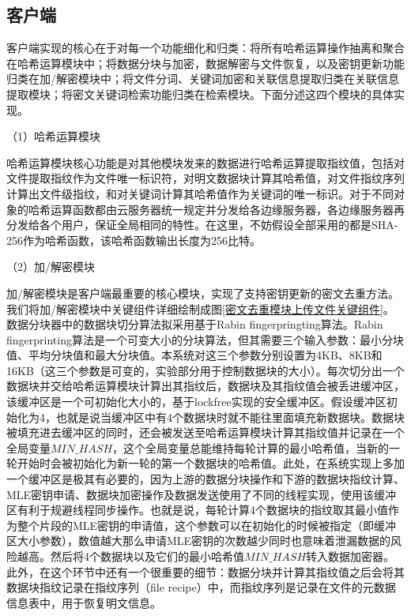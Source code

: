 \documentclass[promaster]{thesis-uestc}
\begin{document}
\subsection{客户端}
客户端实现的核心在于对每一个功能细化和归类：将所有哈希运算操作抽离和聚合在哈希运算模块中；将数据分块与加密，数据解密与文件恢复，以及密钥更新功能归类在加/解密模块中；将文件分词、关键词加密和关联信息提取归类在关联信息
提取模块；将密文关键词检索功能归类在检索模块。下面分述这四个模块的具体实现。

（1）哈希运算模块\label{哈希运算模块}

哈希运算模块核心功能是对其他模块发来的数据进行哈希运算提取指纹值，包括对文件提取指纹作为文件唯一标识符，对明文数据块计算其哈希值，对文件指纹序列计算出文件级指纹，和对关键词计算其哈希值作为关键词的唯一标识。对于不同对象的哈希运算函数都由云服务器统一规定并分发给各边缘服务器，各边缘服务器再分发给各个用户，保证全局相同的特性。在这里，不妨假设全部采用的都是SHA-256作为哈希函数，该哈希函数输出长度为256比特。

（2）加/解密模块

加/解密模块是客户端最重要的核心模块，实现了支持密钥更新的密文去重方法。我们将加/解密模块中关键组件详细绘制成图\ref{密文去重模块上传文件关键组件}。数据分块器中的数据块切分算法拟采用基于Rabin fingerpringting算法。Rabin fingerprinting算法是一个可变大小的分块算法，但其需要三个输入参数：最小分块值、平均分块值和最大分块值。本系统对这三个参数分别设置为4KB、8KB和16KB（这三个参数是可变的，实验部分用于控制数据块的大小）。每次切分出一个数据块并交给哈希运算模块计算出其指纹后，数据块及其指纹值会被丢进缓冲区，该缓冲区是一个可初始化大小的，基于lockfree实现的安全缓冲区。假设缓冲区初始化为4，也就是说当缓冲区中有4个数据块时就不能往里面填充新数据块。数据块被填充进去缓冲区的同时，还会被发送至哈希运算模块计算其指纹值并记录在一个全局变量$MIN\_HASH$，这个全局变量总能维持每轮计算的最小哈希值，当新的一轮开始时会被初始化为新一轮的第一个数据块的哈希值。此处，在系统实现上多加一个缓冲区是极其有必要的，因为上游的数据分块操作和下游的数据块指纹计算、MLE密钥申请、数据块加密操作及数据发送使用了不同的线程实现，使用该缓冲区有利于规避线程同步操作。也就是说，每轮计算4个数据块的指纹取其最小值作为整个片段的MLE密钥的申请值，这个参数可以在初始化的时候被指定（即缓冲区大小参数），数值越大那么申请MLE密钥的次数越少同时也意味着泄漏数据的风险越高。然后将4个数据块以及它们的最小哈希值$MIN\_HASH$转入数据加密器。此外，在这个环节中还有一个很重要的细节：数据分块并计算其指纹值之后会将其数据块指纹记录在指纹序列（file recipe）中，而指纹序列是记录在文件的元数据信息表中，用于恢复明文信息。
\end{document}
